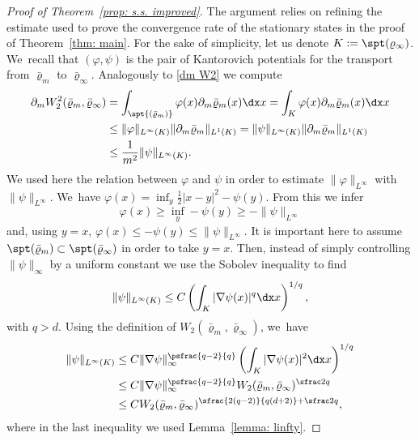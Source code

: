 \begin{proof}[Proof of Theorem~\ref{prop: s.s. improved}]

The argument relies on refining the estimate used to prove the convergence rate of the stationary states in the proof of Theorem~\ref{thm: main}. For the sake of simplicity, let us denote $K:=\spt(\varrho_\infty)$. We~recall that $(\varphi,\psi)$ is the pair of Kantorovich potentials for the transport from $\bar\varrho_m$ to $\bar\varrho_\infty$. Analogously to \eqref{dm W2} we compute
\begin{equation}\label{dm W2 new}
\begin{aligned}
\partial_m W_2^2(\bar\varrho_m, \bar\varrho_\infty)&= \int_{\spt{(\bar\varrho_m)}} \varphi (x) \partial_m \bar\varrho_m(x) \dx x= \int_{K} \varphi (x) \partial_m \bar\varrho_m(x) \dx x\\
&\leq \|\varphi\|_{L^\infty(K)} \|\partial_m \bar\varrho_m\|_{L^1(K)}=\|\psi\|_{L^\infty(K)} \|\partial_m \bar\varrho_m\|_{L^1(K)}\\
&\leq \frac{1}{m^2} \|\psi\|_{L^\infty(K)}.
\end{aligned}
\end{equation}
We used here the relation between $\varphi$ and $\psi $ in order to estimate $\|\varphi\|_{L^\infty}$ with $\|\psi\|_{L^\infty}$. We~have $\varphi(x)=\inf_y \frac12|x-y|^2-\psi(y)$. From this we infer
\[
\varphi(x)\geq \inf_y-\psi(y)\geq -\|\psi\|_{L^\infty}
\]
and, using $y=x$, $\varphi(x)\leq-\psi(y)\leq \|\psi\|_{L^\infty}$. It is important here to assume $\spt(\bar\varrho_m)\subset\spt (\bar\varrho_\infty)$ in order to take $y=x$. Then, instead of simply controlling $\|\psi\|_\infty$ by a uniform constant we use the Sobolev inequality to find
\begin{equation*}
\|\psi\|_{L^\infty(K)} \leq C \left(\int_{K} |\nabla \psi(x)|^{q} \dx x\right)^{1/{ q}},
\end{equation*}
with ${q}>d$. Using the definition of $W_2(\bar\varrho_m,\bar\varrho_\infty)$, we~have
\begin{align*}
\|\psi\|_{L^\infty(K)} &\leq {C}\|\nabla \psi\|_\infty^{\psfrac{{ q}-2}{{q}}} \left(\int_{K} |\nabla \psi(x)|^2 \dx x\right)^{1/{q}}\\
&\leq {C}\|\nabla \psi\|_\infty^{\psfrac{{ q}-2}{{q}}} W_2(\bar\varrho_m,\bar\varrho_\infty)^{\sfrac 2{q}}\\
&\leq { C}W_2(\bar\varrho_m,\bar\varrho_\infty)^{\sfrac{2({ q}-2)}{{ q}(d+2)} +\sfrac 2{ q}},
\end{align*}
where in the last inequality we used Lemma~\ref{lemma: linfty}.

\end{proof}
